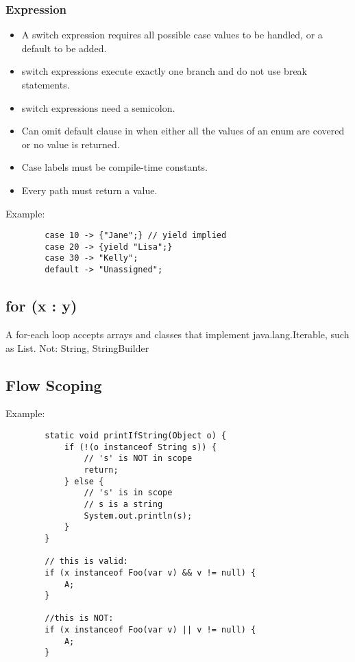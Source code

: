 \documentclass{scrartcl}
\begin{document}
\subsubsection{Expression}

    \begin{itemize}
        \item A switch expression requires all possible case values to be handled, or a default to be added.
        \item switch expressions execute exactly one branch and do not use break statements.
        \item switch expressions need a semicolon.
        \item Can omit default clause in when either all the values of an enum are covered or no value is returned.
        \item Case labels must be compile-time constants.
        \item Every path must return a value.
    \end{itemize}

    Example:

    \begin{lstlisting}
        case 10 -> {"Jane";} // yield implied
        case 20 -> {yield "Lisa";}
        case 30 -> "Kelly";
        default -> "Unassigned";
    \end{lstlisting}

\subsection{ for (x : y)}

     A for-­each loop accepts arrays and classes that implement java.lang.Iterable, such as List. Not: String, StringBuilder

\subsection{Flow Scoping}

    Example:

    \begin{lstlisting}
        static void printIfString(Object o) {
            if (!(o instanceof String s)) {
                // 's' is NOT in scope
                return;
            } else {
                // 's' is in scope
                // s is a string
                System.out.println(s);
            }
        }

        // this is valid:
        if (x instanceof Foo(var v) && v != null) {
            A;
        }

        //this is NOT:
        if (x instanceof Foo(var v) || v != null) {
            A;
        }
    \end{lstlisting}
\end{document}
